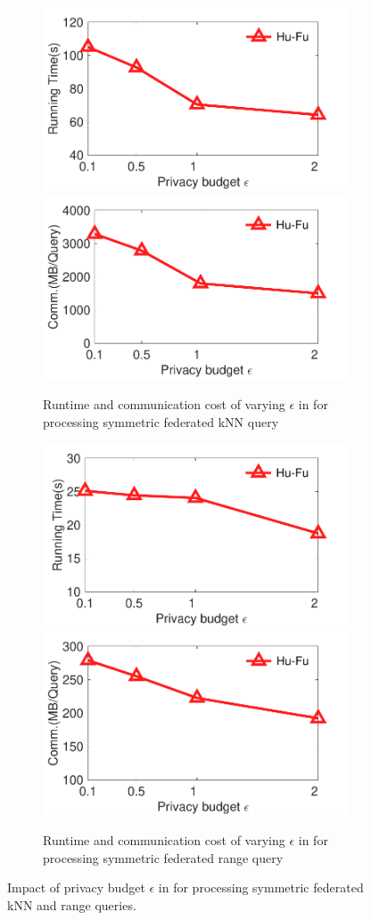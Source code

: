 \begin{figure}[t]
    \centering
    \begin{subfigure}{0.48\textwidth}
        \centering
        \includegraphics[width=0.48\linewidth]{apdx/epsilon_knnquery_time.pdf}
        \includegraphics[width=0.48\linewidth]{apdx/epsilon_knnquery_comm.pdf}
        \caption{Runtime and communication cost of varying  $\epsilon$ in \sysname for processing symmetric federated kNN query}
        \label{fig:epsilon_knn}
    \end{subfigure}
    \begin{subfigure}{0.48\textwidth}
        \centering
        \includegraphics[width=0.48\linewidth]{apdx/epsilon_rangequery_time.pdf}
        \includegraphics[width=0.48\linewidth]{apdx/epsilon_rangequery_comm.pdf}
        \caption{Runtime and communication cost of varying $\epsilon$ in \sysname for processing symmetric federated range query}
        \label{fig:epsilon_rangequery}
    \end{subfigure}
    \caption{Impact of privacy budget $\epsilon$ in \sysname for processing symmetric federated kNN and range queries.}
    \label{fig:epsilon_eff}
\end{figure}

